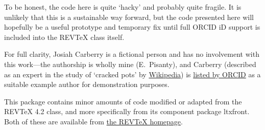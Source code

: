 \documentclass[%
  reprint,
  aps,
  pra,
  superscriptaddress,
  a4paper,
]{revtex4-2}
\begin{document}
To be honest, the code here is quite `hacky' and probably quite fragile.
It is unlikely that this is a sustainable way forward, but the code presented here will hopefully be a useful prototype and temporary fix until full ORCID iD support is included into the REVTeX class itself.

For full clarity, Josiah Carberry is a fictional person and has no involvement with this work---the authorship is wholly mine (E.\ Pisanty), and Carberry (described as an expert in the study of `cracked pots' by \href{https://en.wikipedia.org/wiki/Josiah_S._Carberry}{Wikipedia}) is \href{https://support.orcid.org/hc/en-us/articles/360006897674-Structure-of-the-ORCID-Identifier}{listed by ORCID} as a suitable example author for demonstration purposes.

This package contains minor amounts of code modified or adapted from the REVTeX 4.2 class, and more specifically from its component package ltxfront. Both of these are available from \href{https://journals.aps.org/revtex}{the REVTeX homepage}.

\listoforcidids
\end{document}
